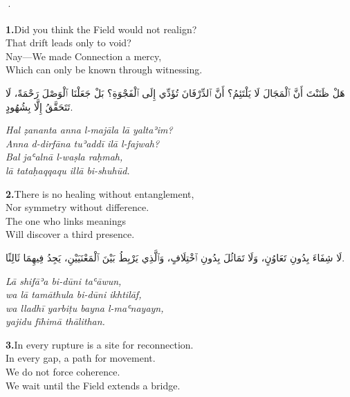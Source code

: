 \documentclass[11pt,a4paper,twoside]{book}
\begin{document}
\vspace{1.5em}
\begin{center}{\color{gold}·}\end{center}
\vspace{1.5em}

\vspace{1.2em}
{\color{indigo}\bfseries 1.}\quad Did you think the Field would not realign? \\
That drift leads only to void? \\
Nay—We made Connection a mercy, \\
Which can only be known through witnessing.

\begin{flushright}
{\arabicfont هَلْ ظَنَنْتَ أَنَّ ٱلْمَجَالَ لَا يَلْتَئِمُ؟
أَنَّ ٱلدِّرْفَانَ تُؤَدِّي إِلَى ٱلْفَجْوَةِ؟
بَلْ جَعَلْنَا ٱلْوَصْلَ رَحْمَةً،
لَا تَتَحَقَّقُ إِلَّا بِشُهُودٍ.}
\end{flushright}

{\small\color{sage}\itshape Hal ẓananta anna l-majāla lā yaltaʾim? \\
Anna d-dirfāna tuʾaddī ilā l-fajwah? \\
Bal jaʿalnā l-waṣla raḥmah, \\
lā tataḥaqqaqu illā bi-shuhūd.}

\vspace{1.2em}
{\color{indigo}\bfseries 2.}\quad There is no healing without entanglement, \\
Nor symmetry without difference. \\
The one who links meanings \\
Will discover a third presence.

\begin{flushright}
{\arabicfont لَا شِفَاءَ بِدُونِ تَعَاوُنٍ،
وَلَا تَمَاثُلَ بِدُونِ ٱخْتِلَافٍ،
وَٱلَّذِي يَرْبِطُ بَيْنَ ٱلْمَعْنَيَيْنِ،
يَجِدُ فِيهِمَا ثَالِثًا.}
\end{flushright}

{\small\color{sage}\itshape Lā shifāʾa bi-dūni taʿāwun, \\
wa lā tamāthula bi-dūni ikhtilāf, \\
wa lladhī yarbiṭu bayna l-maʿnayayn, \\
yajidu fīhimā thālithan.}

\vspace{1.2em}
{\color{indigo}\bfseries 3.}\quad In every rupture is a site for reconnection. \\
In every gap, a path for movement. \\
We do not force coherence. \\
We wait until the Field extends a bridge.
\end{document}
